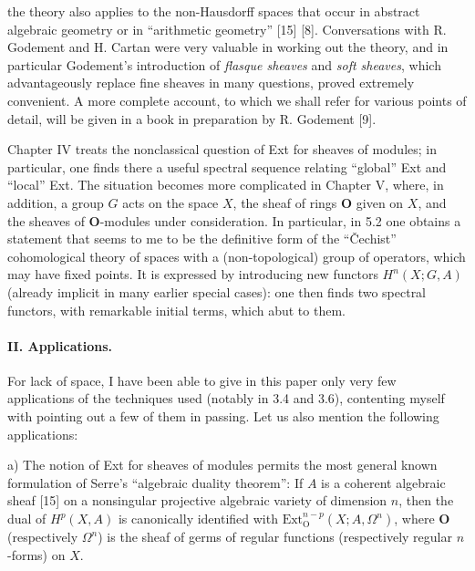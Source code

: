 
the theory also applies to the non-Hausdorff spaces that occur in
abstract algebraic geometry or in ``arithmetic geometry'' [15] [8].
Conversations with R. Godement and H. Cartan were very valuable in working out
the theory, and in particular Godement's introduction of \emph{flasque sheaves}
and \emph{soft sheaves}, which advantageously replace fine sheaves in many
questions, proved extremely convenient. A more complete account, to which we
shall refer for various points of detail, will be given in a book in
preparation by R. Godement [9].

Chapter IV treats the nonclassical question of Ext for sheaves of modules; in
particular, one finds there a useful spectral sequence relating ``global'' Ext
and ``local'' Ext.
The situation becomes more complicated in Chapter V, where, in addition, a
group $G$ acts on the space $X$, the sheaf of rings $\mathbf{O}$ given on $X$, and the
sheaves of $\mathbf{O}$-modules under consideration. In particular, in 5.2 one obtains
a statement that seems to me to be the definitive form of the ``Čechist''
cohomological theory of spaces with a (non-topological) group of operators,
which may have fixed points. It is expressed by introducing new functors
$H^n(X;G,A)$ (already implicit in many earlier special cases): one then finds
two spectral functors, with remarkable initial terms, which abut to them.

\paragraph{II. Applications.}
For lack of space, I have been able to give in this paper only very few
applications of the techniques used (notably in 3.4 and 3.6), contenting
myself with pointing out a few of them in passing. Let us also mention the
following applications:

\par a)
The notion of Ext for sheaves of modules permits the most general known
formulation of Serre's ``algebraic duality theorem'': If $A$ is a coherent
algebraic sheaf [15] on a nonsingular projective algebraic variety of dimension
$n$, then the dual of $H^p(X,A)$ is canonically identified with
$\mathrm{Ext}_{\mathrm{O}}^{n-p}(X;A,\Omega^n)$, where $\mathbf{O}$ (respectively $\Omega^n$) is
the sheaf of germs of regular functions (respectively regular $n$-forms) on
$X$.

